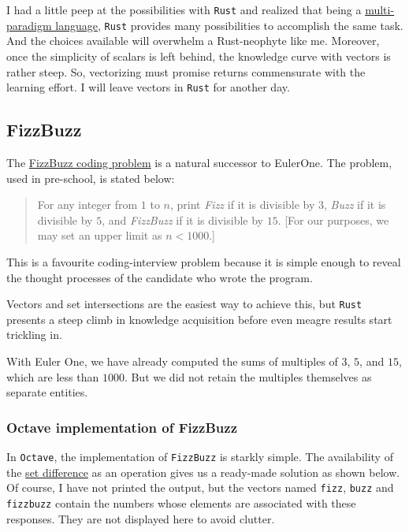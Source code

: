 \documentclass[
  a4paper,
]{article}
\begin{document}
I had a little peep at the possibilities with \texttt{Rust} and realized
that being a
\href{https://en.wikipedia.org/wiki/Comparison_of_multi-paradigm_programming_languages}{multi-paradigm
language}, \texttt{Rust} provides many possibilities to accomplish the
same task. And the choices available will overwhelm a Rust-neophyte like
me. Moreover, once the simplicity of scalars is left behind, the
knowledge curve with vectors is rather steep. So, vectorizing must
promise returns commensurate with the learning effort. I will leave
vectors in \texttt{Rust} for another day.

\hypertarget{fizzbuzz}{%
\subsection{FizzBuzz}\label{fizzbuzz}}

The \href{https://leetcode.com/problems/fizz-buzz/}{FizzBuzz coding
problem} is a natural successor to EulerOne. The problem, used in
pre-school, is stated below:

\begin{quote}
For any integer from \(1\) to \(n\), print \emph{Fizz} if it is
divisible by \(3\), \emph{Buzz} if it is divisible by \(5\), and
\emph{FizzBuzz} if it is divisible by \(15\). {[}For our purposes, we
may set an upper limit as \(n < 1000\).{]}
\end{quote}

This is a favourite coding-interview problem because it is simple enough
to reveal the thought processes of the candidate who wrote the program.

Vectors and set intersections are the easiest way to achieve this, but
\texttt{Rust} presents a steep climb in knowledge acquisition before
even meagre results start trickling in.

With Euler One, we have already computed the sums of multiples of \(3\),
\(5\), and \(15\), which are less than \(1000\). But we did not retain
the multiples themselves as separate entities.

\hypertarget{octave-implementation-of-fizzbuzz}{%
\subsubsection{Octave implementation of
FizzBuzz}\label{octave-implementation-of-fizzbuzz}}

In \texttt{Octave}, the implementation of \texttt{FizzBuzz} is starkly
simple. The availability of the
\href{https://en.wikipedia.org/wiki/Complement_(set_theory)\#Relative_complement}{set
difference} as an operation gives us a ready-made solution as shown
below. Of course, I have not printed the output, but the vectors named
\texttt{fizz}, \texttt{buzz} and \texttt{fizzbuzz} contain the numbers
whose elements are associated with these responses. They are not
displayed here to avoid clutter.
\end{document}
